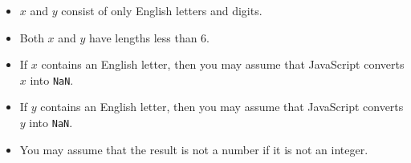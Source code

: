 \begin{itemize}
\tightlist
\item $x$ and $y$ consist of only English letters and digits.
\item Both $x$ and $y$ have lengths less than 6.
\item If $x$ contains an English letter, then you may assume that
JavaScript converts $x$ into \verb+NaN+.
\item If $y$ contains an English letter, then you may assume that 
JavaScript converts $y$ into \verb+NaN+.
\item You may assume that the result is not a number if it is not an integer.
\end{itemize}
